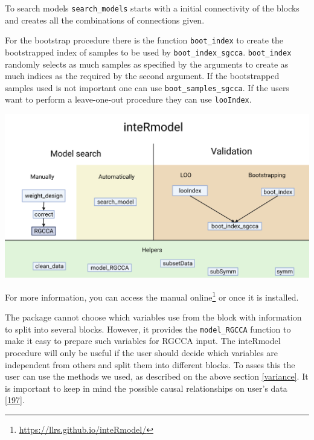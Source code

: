 \documentclass[
  12pt,
  a4paper,
  twoside,
  openright]{book}
\DeclareRobustCommand{\href}[2]{#2\footnote{\url{#1}}}
\let\origfigure\figure
\let\endorigfigure\endfigure
\renewenvironment{figure}[1][2] {
    \expandafter\origfigure\expandafter[!htp]
} {
    \endorigfigure
}
\begin{document}
To search models \texttt{search\_models} starts with a initial connectivity of the blocks and creates all the combinations of connections given.

For the bootstrap procedure there is the function \texttt{boot\_index} to create the bootstrapped index of samples to be used by \texttt{boot\_index\_sgcca}.
\texttt{boot\_index} randomly selects as much samples as specified by the arguments to create as much indices as the required by the second argument.
If the bootstrapped samples used is not important one can use \texttt{boot\_samples\_sgcca}.
If the users want to perform a leave-one-out procedure they can use \texttt{looIndex}.

\begin{figure}
\includegraphics[width=1\linewidth]{images/inteRmodel-workflows} \caption[inteRmodel functions and workflow.]{`inteRmodel` functions and workflow. Functions provided by the inteRmodel package to search and validate models of relationships using RGCCA. Created with BioRender.com}\label{fig:intermodel-workflows}
\end{figure}

For more information, you can access the \href{https://llrs.github.io/inteRmodel/}{manual online} or once it is installed.

The package cannot choose which variables use from the block with information to split into several blocks.
However, it provides the \texttt{model\_RGCCA} function to make it easy to prepare such variables for RGCCA input.
The inteRmodel procedure will only be useful if the user should decide which variables are independent from others and split them into different blocks.
To asses this the user can use the methods we used, as described on the above section \ref{variance}.
It is important to keep in mind the possible causal relationships on user's data {[}\protect\hyperlink{ref-greenland2002}{197}{]}.
\end{document}
